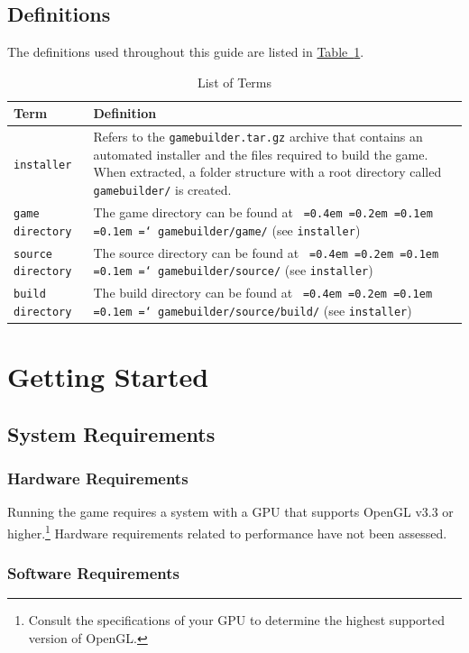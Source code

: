 \documentclass[12pt, titlepage]{article}
\newcommand*\justify{%
  \fontdimen2\font=0.4em%
  \fontdimen3\font=0.2em%
  \fontdimen4\font=0.1em%
  \fontdimen7\font=0.1em%
  \hyphenchar\font=`\-%
}
\begin{document}
\subsection{Definitions}
The definitions used throughout this guide are listed in \hyperref[tab:terminology]{Table~\ref*{tab:terminology}}.


\begin{table}[H]
\caption{List of Terms} \label{tab:terminology}
\renewcommand{\arraystretch}{1.2}
\begin{tabularx}{\textwidth}{p{4cm}X}
\toprule {\bf Term} & {\bf Definition}\\
\midrule
\texttt{installer} & Refers to the \texttt{gamebuilder.tar.gz} archive that contains an automated installer and the files required to build the game.  When extracted, a folder structure with a root directory called \texttt{gamebuilder/} is created.\\
\texttt{game directory} & The game directory can be found at \texttt{\justify gamebuilder/game/} (see \texttt{installer}) \\
\texttt{source directory} & The source directory can be found at \texttt{\justify gamebuilder/source/} (see \texttt{installer}) \\
\texttt{build directory} & The build directory can be found at \texttt{\justify gamebuilder/source/build/} (see \texttt{installer}) \\
\bottomrule
\end{tabularx}
\end{table}
\section{Getting Started}
\label{sec:gettingstarted}
\subsection{System Requirements}
\subsubsection{Hardware Requirements}
Running the game requires a system with a GPU that supports OpenGL v3.3 or higher.\footnote{Consult the specifications of your GPU to determine the highest supported version of OpenGL.}  Hardware requirements related to performance have not been assessed.
\subsubsection{Software Requirements}
\end{document}
